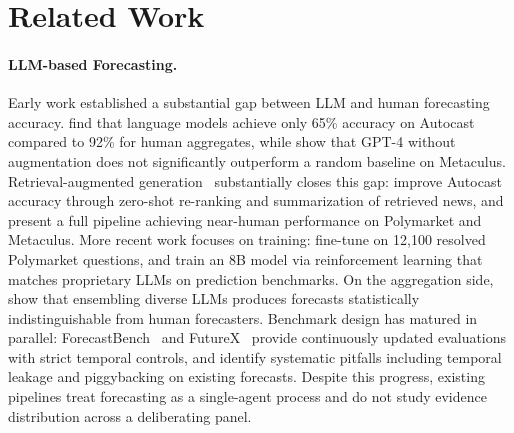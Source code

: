 \documentclass[11pt]{article}
\theoremstyle{plain}
\theoremstyle{definition}
\begin{document}
\section{Related Work}
\label{sec:related}


\paragraph{LLM-based Forecasting.}
Early work established a substantial gap between LLM and human forecasting accuracy.
\citet{zou2022forecasting} find that language models achieve only 65\% accuracy on Autocast compared to 92\% for human aggregates, while \citet{schoenegger2023large} show that GPT-4 without augmentation does not significantly outperform a random baseline on Metaculus.
Retrieval-augmented generation~\citep{lewis2020retrieval} substantially closes this gap: \citet{yanautocast++} improve Autocast accuracy through zero-shot re-ranking and summarization of retrieved news, and \citet{halawi2024approaching} present a full pipeline achieving near-human performance on Polymarket and Metaculus.
More recent work focuses on training: \citet{turtel2025llms} fine-tune on 12,100 resolved Polymarket questions, and \citet{chandakscaling} train an 8B model via reinforcement
learning that matches proprietary LLMs on prediction benchmarks.
On the aggregation side, \citet{schoenegger2024wisdom} show that ensembling diverse
LLMs produces forecasts statistically indistinguishable from human forecasters.
Benchmark design has matured in parallel: ForecastBench~\citep{karger2024forecastbench}
and FutureX~\citep{zeng2025futurex} provide continuously updated evaluations with strict
temporal controls, and \citet{paleka2025pitfalls} identify systematic pitfalls including
temporal leakage and piggybacking on existing forecasts.
Despite this progress, existing pipelines treat forecasting as a single-agent process
and do not study evidence distribution across a deliberating panel.
\end{document}
